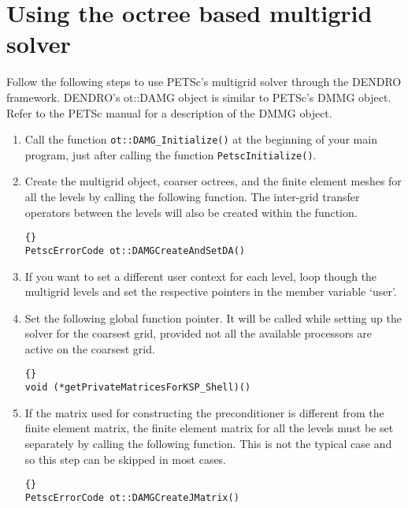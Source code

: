 \documentclass[12pt,reqno,a4paper]{report}
\numberwithin{equation}{section}
\begin{document}
\chapter{Using the octree based multigrid solver}
\label{chp:multigrid}
Follow the following steps to use PETSc's multigrid solver through the DENDRO framework. DENDRO's ot::DAMG object is similar to PETSc's DMMG object. Refer to the PETSc manual for a description of the DMMG object.
\begin{enumerate}
\item Call the function \lstinline[basicstyle=\bfseries]!ot::DAMG_Initialize()! at the beginning of your main program, just after calling the function  \lstinline[basicstyle=\bfseries]!PetscInitialize()!.

\item Create the multigrid object, coarser octrees, and the finite element meshes for all the levels by calling the following function. The inter-grid transfer operators between the levels will also be created within the function.

\begin{lstlisting}[frame=trbl]{}
PetscErrorCode ot::DAMGCreateAndSetDA()
\end{lstlisting}

\item If you want to set a different user context for each level, loop though the multigrid levels and set the respective pointers in the member variable `user'. 

\item Set the following global function pointer. It will be called while setting up the solver for the coarsest grid, provided not all the available processors are active on the coarsest grid.

\begin{lstlisting}[frame=trbl]{}
void (*getPrivateMatricesForKSP_Shell)()
\end{lstlisting}

\item If the matrix used for constructing the preconditioner is different from the finite element matrix, the finite element matrix for all the levels must be set separately by calling the following function. This is not the typical case and so this step can be skipped in most cases.

\begin{lstlisting}[frame=trbl]{}
PetscErrorCode ot::DAMGCreateJMatrix()
\end{lstlisting}


\end{enumerate}
\end{document}
